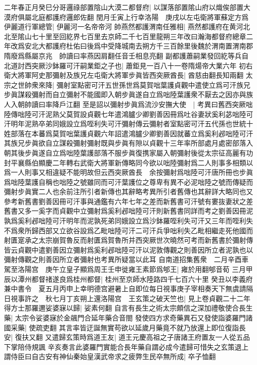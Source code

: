 二年春正月癸巳分哥邏祿部置陰山大漠二都督府|{
	以謀落部置隂山府以熾俟部置大漠府俱屬北庭都護府邏郎佐翻}
閏月壬寅上行幸洛陽　庚戌以左屯衛將軍蘇定方爲伊麗道行軍總管|{
	伊麗河一名帝帝河}
帥燕然都護渭南任雅相|{
	燕然都護府在黄河北北至隂山七十里至回紇界七百里去京師二千七百里龍朔三年改曰瀚海都督府總章二年改爲安北大都護府杜佑曰後爲中受降城南去朔方千三百餘里後魏於渭南置渭南郡隋廢爲縣屬京兆　帥讀曰率燕因肩翻任音壬相息亮翻}
副都護蕭嗣業發回紇等兵自北道討西突厥沙鉢羅可汗嗣業鉅之子也|{
	蕭鉅見一百八十一卷隋煬帝大業六年}
初右衛大將軍阿史那彌射及族兄左屯衛大將軍步眞皆西突厥酋長|{
	酋慈由翻長知兩翻}
太宗之世帥衆來降|{
	彌射室點密可汗五世孫世爲莫賀咄葉護貞觀中遣使立爲可汗族兄步眞謀殺彌射而自立彌射不能國即入朝步眞遂自立爲咄陸葉護衆不厭去之因亦與族人入朝帥讀曰率降戶江翻}
至是詔以彌射步眞爲流沙安撫大使　|{
	考異曰舊西突厥咄陸傳咄陸可汗泥熟父莫賀設貞觀七年遣鴻臚少卿劉善因冊爲吐谷妻狀奚利苾咄陸可汗明年泥熟卒弟同娥設立爲咥利失可汗彌射傳云彌射者室點密可汗五代孫也世統十姓部落在本蕃爲莫賀咄葉護貞觀六年詔遣鴻臚少卿劉善因就蕃立爲奚利邲咄陸可汗其族兄步眞欲自立謀殺彌射彌射既與步眞有隙以貞觀十三年率所部處月處密部落入朝其後步眞遂自立爲咄陸葉護部落不服步眞復携家屬入朝彌射後從太宗征高麗有功封平襄縣伯顯慶二年轉右武衛大將軍新傳略同今欲以咄陸彌射爲二人則事多相類以爲一人則事又相違疑不能明故但云西突厥酋長　余按彌射爲咄陸可汗唐所冊也步眞爲咄陸葉護自稱也咄陸之號雖同而可汗葉護位之尊卑有異不必泥咄陸之號而傳疑而彌射步眞實二人也余前注所引者新傳也其辭略考異所引者舊傳也其辭詳大略同也又參考新舊書劉善因冊可汗事與通鑑有六年七年之差而新舊書可汗號有婁抜妻狀之差舊書又多一奚字而貞觀中立彌射爲奚利邲咄陸可汗則新舊書同詳而考之劉善因冊泥孰爲奚利邲咄陸可汗明年而泥孰死弟同娥設立爲沙鉢羅咥利失可汗又三年而咥利失不爲衆所歸西部又立欲谷設爲乙毗咄陸可汗二可汗兵爭咄利失乙毗相繼走死他國而射匱寔承之太宗崩賀魯反而射匱爲賀魯所并西突厥世次曉然可考而新舊書於彌射傳皆云貞觀中遣劉善因立彌射爲奚利邲咄陸可汗以泥敦傳觀之則善因所立者泥孰也以彌射傳觀之則善因所立者彌射也考異所疑當以此耳}
自南道招集舊衆　二月辛酉車駕至洛陽宫　庚午立皇子顯爲周王壬申徙雍王素節爲郇王|{
	雍於用翻郇音荀}
三月甲辰以潭州都督禇遂良爲桂州都督|{
	桂州至京師水陸路四千七百六十里}
癸丑以李義府兼中書令　夏五月丙申上幸明德宫避暑上自即位每日視事庚子宰相奏天下無虞請隔日視事許之　秋七月丁亥朔上還洛陽宫　王玄策之破天竺也|{
	見上卷貞觀二十二年}
得方士那羅邇娑婆寐以歸|{
	娑素何翻}
自言有長生之術太宗頗信之深加禮敬使合長生藥|{
	太宗令娑婆寐於金飊門合延年藥合音閤}
發使四方求奇藥異石又發使詣婆羅門諸國采藥|{
	使疏吏翻}
其言率皆迂誕無實苟欲以延歲月藥竟不就乃放還上即位復詣長安|{
	復扶又翻}
又遣歸玄策時爲道王友|{
	道王元慶高祖之子唐諸王府置友一人從五品下掌陪侍規諷}
辛亥奏言此婆羅門實能合長年藥自謂必成今遣歸可惜失之玄策退上謂侍臣曰自古安有神仙秦始皇漢武帝求之疲弊生民卒無所成|{
	卒子恤翻}
